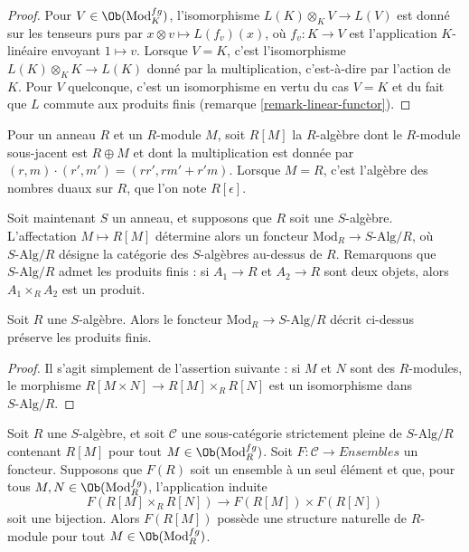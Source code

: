 \begin{proof}
Pour $V \in \Ob(\text{Mod}^{fg}_K)$, l'isomorphisme
$L(K) \otimes_K V \to L(V)$ est donné sur les tenseurs purs par
$x \otimes v \mapsto L(f_v)(x)$, où $f_v: K \to V$ est l'application
$K$-linéaire envoyant $1 \mapsto v$. Lorsque $V = K$, c'est l'isomorphisme
$L(K) \otimes_K K \to L(K)$ donné par la multiplication, c'est-à-dire par
l'action de $K$. Pour $V$
quelconque, c'est un isomorphisme en vertu du cas $V = K$ et du fait que $L$
commute aux produits finis (remarque \ref{remark-linear-functor}).
\end{proof}

\noindent
Pour un anneau $R$ et un $R$-module $M$, soit $R[M]$ la $R$-algèbre dont le
$R$-module sous-jacent est $R \oplus M$ et dont la multiplication est donnée
par $(r, m) \cdot (r', m') = (rr', rm' + r'm)$. Lorsque $M = R$, c'est
l'algèbre des nombres duaux sur $R$, que l'on note $R[\epsilon]$.

\medskip\noindent
Soit maintenant $S$ un anneau, et supposons que $R$ soit une $S$-algèbre.
L'affectation $M \mapsto R[M]$ détermine alors un foncteur
$\text{Mod}_R \to S\text{-Alg}/R$, où $S\text{-Alg}/R$ désigne la catégorie
des $S$-algèbres au-dessus de $R$. Remarquons que $S\text{-Alg}/R$ admet les
produits finis : si $A_1 \to R$ et $A_2 \to R$ sont deux objets, alors
$A_1 \times_R A_2$ est un produit.

\begin{lemma}
\label{lemma-preserves-products}
Soit $R$ une $S$-algèbre. Alors le foncteur
$\text{Mod}_R \to S\text{-Alg}/R$ décrit ci-dessus préserve les produits
finis.
\end{lemma}

\begin{proof}
Il s'agit simplement de l'assertion suivante : si $M$ et $N$ sont des
$R$-modules, le morphisme $R[M \times N] \to R[M] \times_R R[N]$ est un
isomorphisme dans $S\text{-Alg}/R$.
\end{proof}

\begin{lemma}
\label{lemma-tangent-space-functor}
Soit $R$ une $S$-algèbre, et soit $\mathcal{C}$ une sous-catégorie strictement
pleine de $S\text{-Alg}/R$ contenant $R[M]$ pour tout
$M \in \Ob(\text{Mod}^{fg}_R)$. Soit
$F: \mathcal{C} \to \textit{Ensembles}$ un foncteur. Supposons que $F(R)$ soit un
ensemble à un seul élément et que, pour tous $M, N \in
\Ob(\text{Mod}^{fg}_R)$, l'application
induite
$$
F(R[M] \times_R R[N]) \to F(R[M]) \times F(R[N])
$$
soit une bijection. Alors $F(R[M])$ possède une structure naturelle de
$R$-module pour tout $M
\in \Ob(\text{Mod}^{fg}_R)$.
\end{lemma}

